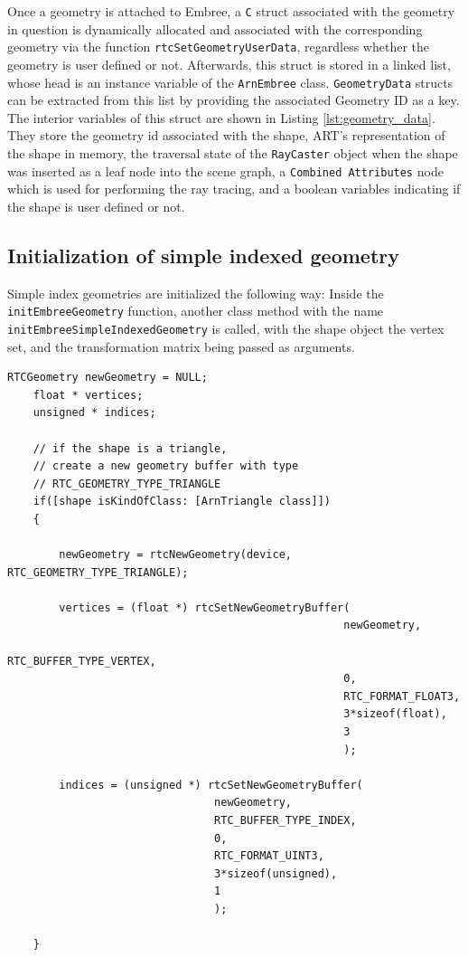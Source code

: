 Once a geometry is attached to Embree, a \texttt{C} struct associated with the geometry in question is dynamically allocated and associated with the corresponding geometry via the function \texttt{rtcSetGeometryUserData}, regardless whether the geometry is user defined or not. 
Afterwards, this struct is stored in a linked list, whose head is an instance variable of the \texttt{ArnEmbree} class. \texttt{GeometryData} structs can be extracted from this list by providing the associated Geometry ID as a key. The interior variables of this struct are shown in Listing \ref{lst:geometry_data}. They store the geometry id associated with the shape, ART's representation of the shape in memory, the traversal state of the \texttt{RayCaster} object when the shape was inserted as a leaf node into the scene graph, a \texttt{Combined Attributes} node which is used for performing the ray tracing, and a boolean variables indicating if the shape is user defined or not.


\subsection{Initialization of simple indexed geometry}
Simple index geometries are initialized the following way: Inside the \texttt{initEmbreeGeometry} function, another class method with the name \texttt{initEmbreeSimpleIndexedGeometry} is called, with the shape object the vertex set, and the transformation matrix being passed as arguments. 

\begin{listing} 
	\begin{lstlisting}[caption={Setting up geometry buffers for the vertices and indices of a triangle shape.}, label={lst:geometry_buffer}]
	RTCGeometry newGeometry = NULL;
	float * vertices;
	unsigned * indices;
	
	// if the shape is a triangle, 
	// create a new geometry buffer with type
	// RTC_GEOMETRY_TYPE_TRIANGLE
	if([shape isKindOfClass: [ArnTriangle class]]) 
	{
	
		newGeometry = rtcNewGeometry(device, RTC_GEOMETRY_TYPE_TRIANGLE);
		
		vertices = (float *) rtcSetNewGeometryBuffer(
													newGeometry,
													RTC_BUFFER_TYPE_VERTEX,
													0,
													RTC_FORMAT_FLOAT3,
													3*sizeof(float),
													3
													);
		
		indices = (unsigned *) rtcSetNewGeometryBuffer(
		                        newGeometry,
		                        RTC_BUFFER_TYPE_INDEX,
		                        0,
		                        RTC_FORMAT_UINT3,
		                        3*sizeof(unsigned),
		                        1
		                        );
	
	}
	\end{lstlisting}
\end{listing}

